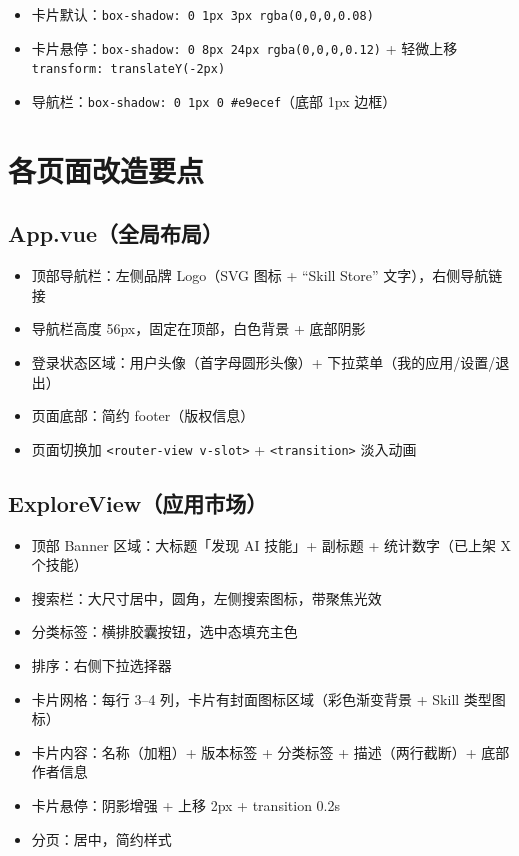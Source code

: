 \documentclass[11pt,a4paper]{article}
\begin{document}
\begin{itemize}[nosep]
  \item 卡片默认：\texttt{box-shadow: 0 1px 3px rgba(0,0,0,0.08)}
  \item 卡片悬停：\texttt{box-shadow: 0 8px 24px rgba(0,0,0,0.12)} + 轻微上移 \texttt{transform: translateY(-2px)}
  \item 导航栏：\texttt{box-shadow: 0 1px 0 \#e9ecef}（底部 1px 边框）
\end{itemize}

\section{各页面改造要点}

\subsection{App.vue（全局布局）}

\begin{itemize}[nosep]
  \item 顶部导航栏：左侧品牌 Logo（SVG 图标 + ``Skill Store'' 文字），右侧导航链接
  \item 导航栏高度 56px，固定在顶部，白色背景 + 底部阴影
  \item 登录状态区域：用户头像（首字母圆形头像）+ 下拉菜单（我的应用/设置/退出）
  \item 页面底部：简约 footer（版权信息）
  \item 页面切换加 \texttt{<router-view v-slot>} + \texttt{<transition>} 淡入动画
\end{itemize}

\subsection{ExploreView（应用市场）}

\begin{itemize}[nosep]
  \item 顶部 Banner 区域：大标题「发现 AI 技能」+ 副标题 + 统计数字（已上架 X 个技能）
  \item 搜索栏：大尺寸居中，圆角，左侧搜索图标，带聚焦光效
  \item 分类标签：横排胶囊按钮，选中态填充主色
  \item 排序：右侧下拉选择器
  \item 卡片网格：每行 3--4 列，卡片有封面图标区域（彩色渐变背景 + Skill 类型图标）
  \item 卡片内容：名称（加粗）+ 版本标签 + 分类标签 + 描述（两行截断）+ 底部作者信息
  \item 卡片悬停：阴影增强 + 上移 2px + transition 0.2s
  \item 分页：居中，简约样式
\end{itemize}
\end{document}
